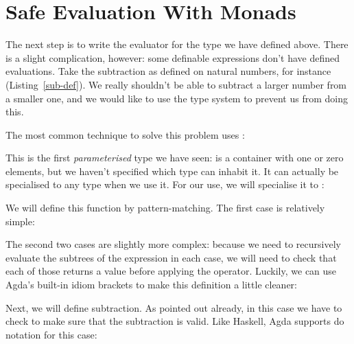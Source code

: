 \section{Safe Evaluation With Monads}
The next step is to write the evaluator for the type we have defined above.
There is a slight complication, however: some definable expressions don't have
defined evaluations.
Take the subtraction as defined on natural numbers, for instance
(Listing~\ref{sub-def}).
We really shouldn't be able to subtract a larger number from a smaller one, and
we would like to use the type system to prevent us from doing this.

The most common technique to solve this problem uses :
\begin{agdalisting}
\end{agdalisting}
This is the first \emph{parameterised} type we have seen: 
is a container with one or zero elements, but we haven't specified which type
can inhabit it.
It can actually be specialised to any type when we use it.
For our use, we will specialise it to :
\begin{agdalisting}
\end{agdalisting}

We will define this function by pattern-matching.
The first case is relatively simple:
\begin{agdalisting}
\end{agdalisting}

The second two cases are slightly more complex: because we need to recursively
evaluate the subtrees of the expression in each case, we will need to check that
each of those returns a  value before applying
the operator.
Luckily, we can use Agda's built-in idiom brackets to make this definition
a little cleaner: 
\begin{agdalisting}
\end{agdalisting}

Next, we will define subtraction.
As pointed out already, in this case we have to check to make sure that the
subtraction is valid.
Like Haskell, Agda supports do notation for this case:
\begin{agdalisting}
\end{agdalisting}

